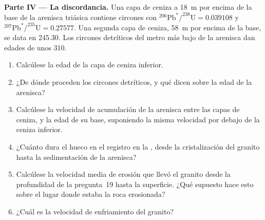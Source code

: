 \begin{problem}
\noindent\textbf{Parte IV --- La discordancia.} Una capa de ceniza a \qty{18}{m} por encima de la base de la arenisca triásica contiene circones con
$^{206}\mathrm{Pb}^*/^{238}\mathrm{U} = 0.039108$ y
$^{207}\mathrm{Pb}^*/^{235}\mathrm{U} = 0.27577$. Una segunda capa de ceniza, \qty{58}{m}
por encima de la base, se data en \qty{245.30}{\Ma}. Los circones detríticos del metro más bajo de la arenisca dan edades de unos \qty{310}{\Ma}.
\begin{enumerate}[resume]
  \item Calcúlese la edad de la capa de ceniza inferior.
  \item ¿De dónde proceden los circones detríticos, y qué dicen sobre la edad de la arenisca?
  \item Calcúlese la velocidad de acumulación de la arenisca entre las capas de
        ceniza, y la edad de su base, suponiendo la misma velocidad por debajo de la ceniza inferior.
  \item ¿Cuánto dura el hueco en el registro en la , desde la
        cristalización del granito hasta la sedimentación de la arenisca?
  \item Calcúlese la velocidad media de erosión que llevó el granito desde la
        profundidad de la pregunta~19 hasta la superficie. ¿Qué supuesto hace esto sobre el lugar donde estaba la roca erosionada?
  \item ¿Cuál es la velocidad de enfriamiento del granito?
\end{enumerate}
\end{problem}
